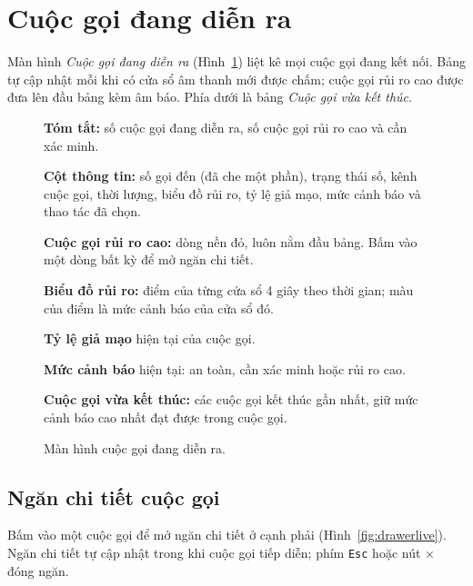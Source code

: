 \documentclass[11pt]{article}
\begin{document}
\section{Cuộc gọi đang diễn ra}

Màn hình \emph{Cuộc gọi đang diễn ra} (Hình~\ref{fig:live}) liệt kê mọi cuộc gọi đang kết nối. Bảng tự cập nhật mỗi khi có cửa sổ âm thanh mới được chấm; cuộc gọi rủi ro cao được đưa lên đầu bảng kèm âm báo. Phía dưới là bảng \emph{Cuộc gọi vừa kết thúc}.

\begin{figure}[tbp]
  \centering
  \caption{Màn hình cuộc gọi đang diễn ra.}
  \label{fig:live}
  \begin{flushleft}\small
\begin{legend}
  \item \textbf{Tóm tắt:} số cuộc gọi đang diễn ra, số cuộc gọi rủi ro cao và cần xác minh.
  \item \textbf{Cột thông tin:} số gọi đến (đã che một phần), trạng thái số, kênh cuộc gọi, thời lượng, biểu đồ rủi ro, tỷ lệ giả mạo, mức cảnh báo và thao tác đã chọn.
  \item \textbf{Cuộc gọi rủi ro cao:} dòng nền đỏ, luôn nằm đầu bảng. Bấm vào một dòng bất kỳ để mở ngăn chi tiết.
  \item \textbf{Biểu đồ rủi ro:} điểm của từng cửa sổ 4 giây theo thời gian; màu của điểm là mức cảnh báo của cửa sổ đó.
  \item \textbf{Tỷ lệ giả mạo} hiện tại của cuộc gọi.
  \item \textbf{Mức cảnh báo} hiện tại: an toàn, cần xác minh hoặc rủi ro cao.
  \item \textbf{Cuộc gọi vừa kết thúc:} các cuộc gọi kết thúc gần nhất, giữ mức cảnh báo cao nhất đạt được trong cuộc gọi.
\end{legend}
  \end{flushleft}
\end{figure}

\subsection{Ngăn chi tiết cuộc gọi}

Bấm vào một cuộc gọi để mở ngăn chi tiết ở cạnh phải (Hình~\ref{fig:drawerlive}). Ngăn chi tiết tự cập nhật trong khi cuộc gọi tiếp diễn; phím \texttt{Esc} hoặc nút $\times$ đóng ngăn.
\end{document}

